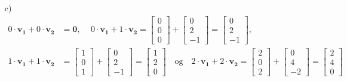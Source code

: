 \documentclass[a4paper, norsk, 12pt]{extarticle}
\begin{document}
\begin{itemize}
\item[c)]
\begin{align*}
    0 \cdot \mathbf{v_1} + 0 \cdot \mathbf{v_2} &= \mathbf{0} \text{, } \quad
    0 \cdot \mathbf{v_1} + 1 \cdot \mathbf{v_2} = \begin{bmatrix}  0 \\  0 \\ 0  \end{bmatrix} + \begin{bmatrix}  0 \\  2 \\ -1  \end{bmatrix}  = \begin{bmatrix}  0 \\  2 \\ -1  \end{bmatrix} \text{,  } \\
    1 \cdot \mathbf{v_1} + 1 \cdot \mathbf{v_2} &= \begin{bmatrix}  1 \\  0 \\ 1  \end{bmatrix}  + \begin{bmatrix}  0 \\  2 \\ -1  \end{bmatrix} = \begin{bmatrix} 1 \\ 2 \\ 0 \end{bmatrix} \quad \text {og} \quad
    2 \cdot \mathbf{v_1} + 2 \cdot \mathbf{v_2} = \begin{bmatrix}  2 \\  0 \\ 2  \end{bmatrix}  + \begin{bmatrix}  0 \\  4 \\ -2  \end{bmatrix} = \begin{bmatrix} 2 \\ 4 \\ 0 \end{bmatrix}
\end{align*}


\end{itemize}
\end{document}
